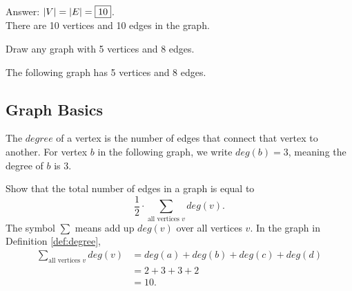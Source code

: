 \documentclass[11pt]{article}
\begin{document}
\begin{solution}
Answer: $\left\lvert V \right\rvert = \left\lvert E \right\rvert = \boxed{10}$. \\
There are 10 vertices and 10 edges in the graph.
\end{solution}

\begin{problem} %
Draw any graph with 5 vertices and 8 edges.
\end{problem}

\begin{solution}
The following graph has 5 vertices and 8 edges.
\begin{center}
\end{center}
\end{solution}

\subsection{Graph Basics}

\begin{definition}
\label{def:degree}
The $degree$ of a vertex is the number of edges that connect that vertex to another. For vertex $b$ in the following graph, we write $deg(b) = 3$,
meaning the degree of $b$ is 3.
\begin{center}
\end{center}
\end{definition}

\begin{problem} %
Show that the total number of edges in a graph is equal to
\[\frac{1}{2} \cdot \sum_{\text{all vertices $v$}} deg(v).\]
The symbol $\sum$ means add up $deg(v)$ over all vertices $v$. In the graph in Definition \ref{def:degree},
\begin{align*}
\sum_{\text{all vertices $v$}} deg(v) &= deg(a) + deg(b) + deg(c) + deg(d) \\
&= 2 + 3 + 3 + 2 \\
&= 10.
\end{align*}
\end{problem}
\end{document}
